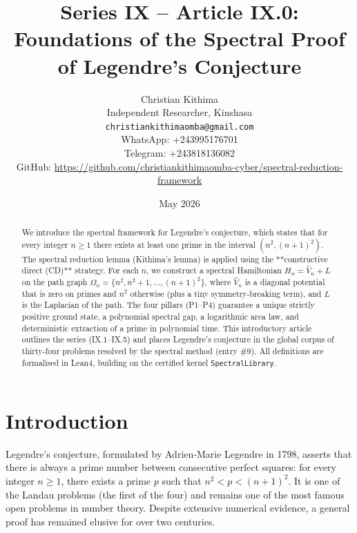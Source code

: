\documentclass[11pt,a4paper]{article}
\title{Series IX – Article IX.0: Foundations of the Spectral Proof of Legendre's Conjecture}
\author{Christian Kithima \\
Independent Researcher, Kinshasa \\
\texttt{christiankithimaomba@gmail.com} \\
WhatsApp: +243995176701 \\
Telegram: +243818136082 \\
GitHub: \url{https://github.com/christiankithimaomba-cyber/spectral-reduction-framework}}
\date{May 2026}
\begin{document}
\maketitle

\begin{abstract}
We introduce the spectral framework for Legendre's conjecture, which states that for every integer $n \ge 1$ there exists at least one prime in the interval $(n^2, (n+1)^2)$. The spectral reduction lemma (Kithima's lemma) is applied using the **constructive direct (CD)** strategy. For each $n$, we construct a spectral Hamiltonian $H_n = \hat{V}_n + L$ on the path graph $\Omega_n = \{n^2, n^2+1, \dots, (n+1)^2\}$, where $\hat{V}_n$ is a diagonal potential that is zero on primes and $n^2$ otherwise (plus a tiny symmetry‑breaking term), and $L$ is the Laplacian of the path. The four pillars (P1–P4) guarantee a unique strictly positive ground state, a polynomial spectral gap, a logarithmic area law, and deterministic extraction of a prime in polynomial time. This introductory article outlines the series (IX.1–IX.5) and places Legendre's conjecture in the global corpus of thirty‑four problems resolved by the spectral method (entry \#9). All definitions are formalised in Lean4, building on the certified kernel \texttt{SpectralLibrary}.
\end{abstract}

\tableofcontents

\section{Introduction}

Legendre's conjecture, formulated by Adrien‑Marie Legendre in 1798, asserts that there is always a prime number between consecutive perfect squares: for every integer $n \ge 1$, there exists a prime $p$ such that $n^2 < p < (n+1)^2$. It is one of the Landau problems (the first of the four) and remains one of the most famous open problems in number theory. Despite extensive numerical evidence, a general proof has remained elusive for over two centuries.
\end{document}
